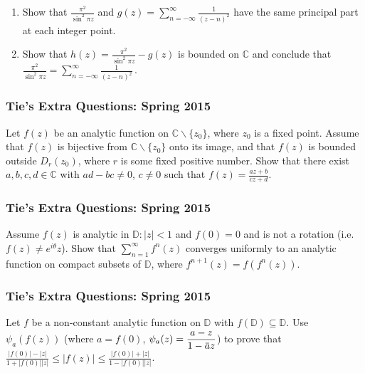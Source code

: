 \begin{enumerate}
\def\labelenumi{(\arabic{enumi})}
\item
  Show that \(\displaystyle \frac{\pi^2}{\sin^2 \pi z}\) and
  \(\displaystyle g(z) = \sum_{n = - \infty}^{ \infty} \frac{1}{(z-n)^2}\)
  have the same principal part at each integer point.
\item
  Show that \(\displaystyle h(z) = \frac{\pi^2}{\sin^2 \pi z} - g(z)\)
  is bounded on \(\mathbb C\) and conclude that
  \(\displaystyle \frac{\pi^2}{\sin^2 \pi z} = \sum_{n = - \infty}^{ \infty} \frac{1}{(z-n)^2} \, .\)
\end{enumerate}

\hypertarget{ties-extra-questions-spring-2015-16}{%
\subsubsection{Tie's Extra Questions: Spring
2015}\label{ties-extra-questions-spring-2015-16}}

Let \(f(z)\) be an analytic function on
\({\mathbb C} \backslash \{ z_0 \}\), where \(z_0\) is a fixed point.
Assume that \(f(z)\) is bijective from
\({\mathbb C} \backslash \{ z_0 \}\) onto its image, and that \(f(z)\)
is bounded outside \(D_r(z_0)\), where \(r\) is some fixed positive
number. Show that there exist \(a, b, c, d \in \mathbb C\) with
\(ad-bc \neq 0\), \(c \neq 0\) such that
\(\displaystyle f(z) = \frac{az + b}{cz + d}\).

\hypertarget{ties-extra-questions-spring-2015-17}{%
\subsubsection{Tie's Extra Questions: Spring
2015}\label{ties-extra-questions-spring-2015-17}}

Assume \(f(z)\) is analytic in \({\mathbb D}: |z|<1\) and \(f(0)=0\) and
is not a rotation (i.e.~\(f(z) \neq e^{i \theta} z\)). Show that
\(\displaystyle \sum_{n=1}^\infty f^{n}(z)\) converges uniformly to an
analytic function on compact subsets of \({\mathbb D}\), where
\(f^{n+1}(z) = f(f^{n}(z))\).

\hypertarget{ties-extra-questions-spring-2015-18}{%
\subsubsection{Tie's Extra Questions: Spring
2015}\label{ties-extra-questions-spring-2015-18}}

Let \(f\) be a non-constant analytic function on \(\mathbb D\) with
\(f(\mathbb D) \subseteq \mathbb D\). Use \(\psi_{a} (f(z))\) (where
\(a=f(0)\),
\(\displaystyle \psi_a(z) = \frac{a - z}{1 - \mkern 1.5mu\overline{\mkern-1.5mua\mkern-1.5mu}\mkern 1.5muz}\))
to prove that
\(\displaystyle \frac{|f(0)| - |z|}{1 + |f(0)||z|} \leq |f(z)| \leq \frac{|f(0)| + |z|}{1 - |f(0)||z|}\).

